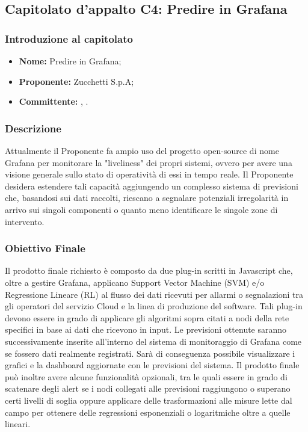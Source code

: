 \subsection{Capitolato d'appalto C4: Predire in Grafana}
	\subsubsection{Introduzione al capitolato}
	\begin{itemize}
		\item \textbf{Nome:} Predire in Grafana;
		\item \textbf{Proponente}\textbf{:} Zucchetti S.p.A;
		\item \textbf{Committente}\textbf{:} \TV, \RC.
	\end{itemize}
	
	\subsubsection{Descrizione}
	Attualmente il Proponente fa ampio uso del progetto open-source di nome Grafana per monitorare la "liveliness" dei propri sistemi, ovvero per avere una visione generale sullo stato di operatività di essi in tempo reale. Il Proponente desidera estendere tali capacità aggiungendo un complesso sistema di previsioni che, basandosi sui dati raccolti, riescano a segnalare potenziali irregolarità in arrivo sui singoli componenti o quanto meno identificare le singole zone di intervento.
	
	\subsubsection{Obiettivo Finale}
	Il prodotto finale richiesto è composto da due plug-in scritti in Javascript che, oltre a gestire Grafana, applicano Support Vector Machine (SVM) e/o Regressione Lineare (RL) al flusso dei dati ricevuti per allarmi o segnalazioni tra gli operatori del servizio Cloud e la linea di produzione del software. Tali plug-in devono essere in grado di applicare gli algoritmi sopra citati a nodi della rete specifici in base ai dati che ricevono in input. Le previsioni ottenute saranno successivamente inserite all'interno del sistema di monitoraggio di Grafana come se fossero dati realmente registrati. Sarà di conseguenza possibile visualizzare i grafici e la dashboard aggiornate con le previsioni del sistema. Il prodotto finale può inoltre avere alcune funzionalità opzionali, tra le quali essere in grado di scatenare degli alert se i nodi collegati alle previsioni raggiungono o superano certi livelli di soglia oppure applicare delle trasformazioni alle misure lette dal campo per ottenere delle regressioni esponenziali o logaritmiche oltre a quelle lineari.
	
